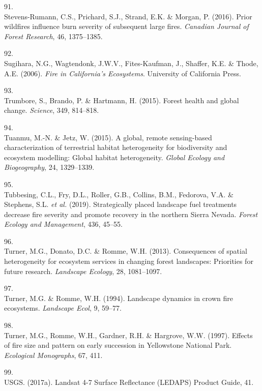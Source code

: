 \documentclass[]{article}
\begin{document}
\leavevmode\hypertarget{ref-stevens-rumann2016a}{}%
91.\\
Stevens-Rumann, C.S., Prichard, S.J., Strand, E.K. \& Morgan, P. (2016).
Prior wildfires influence burn severity of subsequent large fires.
\emph{Canadian Journal of Forest Research}, 46, 1375--1385.

\leavevmode\hypertarget{ref-sugihara2006}{}%
92.\\
Sugihara, N.G., Wagtendonk, J.W.V., Fites-Kaufman, J., Shaffer, K.E. \&
Thode, A.E. (2006). \emph{Fire in California's Ecosystems}. University
of California Press.

\leavevmode\hypertarget{ref-trumbore2015}{}%
93.\\
Trumbore, S., Brando, P. \& Hartmann, H. (2015). Forest health and
global change. \emph{Science}, 349, 814--818.

\leavevmode\hypertarget{ref-tuanmu2015}{}%
94.\\
Tuanmu, M.-N. \& Jetz, W. (2015). A global, remote sensing-based
characterization of terrestrial habitat heterogeneity for biodiversity
and ecosystem modelling: Global habitat heterogeneity. \emph{Global
Ecology and Biogeography}, 24, 1329--1339.

\leavevmode\hypertarget{ref-tubbesing2019}{}%
95.\\
Tubbesing, C.L., Fry, D.L., Roller, G.B., Collins, B.M., Fedorova, V.A.
\& Stephens, S.L. \emph{et al.} (2019). Strategically placed landscape
fuel treatments decrease fire severity and promote recovery in the
northern Sierra Nevada. \emph{Forest Ecology and Management}, 436,
45--55.

\leavevmode\hypertarget{ref-turner2013}{}%
96.\\
Turner, M.G., Donato, D.C. \& Romme, W.H. (2013). Consequences of
spatial heterogeneity for ecosystem services in changing forest
landscapes: Priorities for future research. \emph{Landscape Ecology},
28, 1081--1097.

\leavevmode\hypertarget{ref-turner1994a}{}%
97.\\
Turner, M.G. \& Romme, W.H. (1994). Landscape dynamics in crown fire
ecosystems. \emph{Landscape Ecol}, 9, 59--77.

\leavevmode\hypertarget{ref-turner1997}{}%
98.\\
Turner, M.G., Romme, W.H., Gardner, R.H. \& Hargrove, W.W. (1997).
Effects of fire size and pattern on early succession in Yellowstone
National Park. \emph{Ecological Monographs}, 67, 411.

\leavevmode\hypertarget{ref-usgs2017}{}%
99.\\
USGS. (2017a). Landsat 4-7 Surface Reflectance (LEDAPS) Product Guide,
41.
\end{document}
